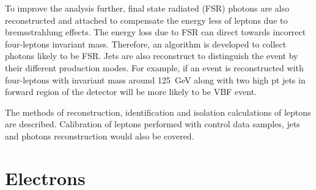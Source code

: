 \par To improve the analysis further, final state  radiated (FSR) photons are also reconstructed and attached to compensate the energy less of leptons due 
to bremsstrahlung effects. The
energy loss due to FSR can direct towards incorrect four-leptons invariant mass. Therefore, an algorithm is developed to collect
photons likely to be FSR. Jets are also reconstruct to distinguish the event by their different production modes. For example, if an event is reconstructed
with four-leptons with invariant mass around 125~GeV along with two high pt jets in forward region of the detector  will be more likely to be VBF event.
\par The methods of reconstruction, identification and isolation calculations of leptons are described. Calibration of leptons performed with control
data samples, jets and photons reconstruction would also be covered.
\section{Electrons}\label{chapter3_sec1}
